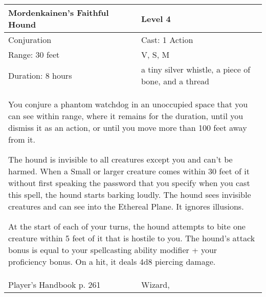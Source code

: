 \documentclass[11pt]{report}
\begin{document}
\begin{table}[H]
	\begin{tabular}{||p{6cm}|p{6cm}||}
		\hline\hline
		\bf{Mordenkainen’s Faithful Hound} & Level 4\\ \hline
		Conjuration & Cast: 1 Action\\ \hline
		Range: 30 feet & V, S, M\\ \hline
		Duration: 8 hours & a tiny silver whistle, a piece of bone, and a thread\\ \hline
		\multicolumn{2}{||p{12cm}||}{You conjure a phantom watchdog in an unoccupied space that you can see within range, where it remains for the duration, until you dismiss it as an action, or until you move more than 100 feet away from it.

The hound is invisible to all creatures except you and can’t be harmed. When a Small or larger creature comes within 30 feet of it without first speaking the password that you specify when you cast this spell, the hound starts barking loudly. The hound sees invisible creatures and can see into the Ethereal Plane. It ignores illusions.

At the start of each of your turns, the hound attempts to bite one creature within 5 feet of it that is hostile to you. The hound’s attack bonus is equal to your spellcasting ability modifier + your proficiency bonus. On a hit, it deals 4d8 piercing damage.}\\ \hline
Player's Handbook p. 261 & Wizard, \\ \hline\hline
	\end{tabular}
\end{table}
\end{document}
